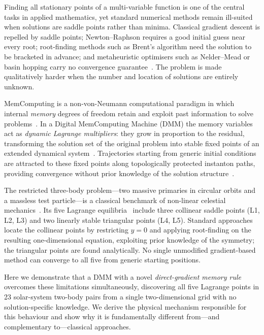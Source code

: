 \documentclass[10pt,twocolumn]{article}
\begin{document}
Finding all stationary points of a multi-variable function is one of the
central tasks in applied mathematics, yet standard numerical methods remain
ill-suited when solutions are saddle points rather than minima.
Classical gradient descent is repelled by saddle points; Newton--Raphson
requires a good initial guess near every root; root-finding methods such as
Brent's algorithm need the solution to be bracketed in advance; and metaheuristic
optimisers such as Nelder--Mead or basin hopping carry no convergence
guarantee~\cite{nocedal2006,press2007}.
The problem is made qualitatively harder when the number and location of
solutions are entirely unknown.

MemComputing is a non-von-Neumann computational paradigm in which internal
\emph{memory} degrees of freedom retain and exploit past information to solve
problems~\cite{diventra2022}.
In a Digital MemComputing Machine (DMM) the memory variables act as
\emph{dynamic Lagrange multipliers}: they grow in proportion to the residual,
transforming the solution set of the original problem into stable fixed points
of an extended dynamical system~\cite{traversa2015,diventra2018}.
Trajectories starting from generic initial conditions are attracted to these
fixed points along topologically protected instanton paths, providing
convergence without prior knowledge of the solution
structure~\cite{diventra2022}.

The restricted three-body problem---two massive primaries in circular orbits
and a massless test particle---is a classical benchmark of non-linear celestial
mechanics~\cite{szebehely1967}.
Its five Lagrange equilibria~\cite{lagrange1772} include three collinear
saddle points (L1, L2, L3) and two linearly stable triangular points (L4, L5).
Standard approaches locate the collinear points by restricting $y=0$ and
applying root-finding on the resulting one-dimensional equation, exploiting
prior knowledge of the symmetry; the triangular points are found analytically.
No single unmodified gradient-based method can converge to all five from
generic starting positions.

Here we demonstrate that a DMM with a novel \emph{direct-gradient memory rule}
overcomes these limitations simultaneously, discovering all five Lagrange
points in 23 solar-system two-body pairs from a single two-dimensional grid
with no solution-specific knowledge.
We derive the physical mechanism responsible for this behaviour and show why it
is fundamentally different from---and complementary to---classical approaches.
\end{document}
